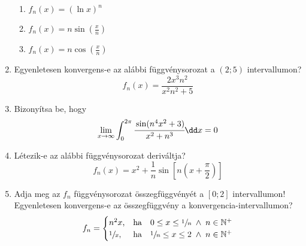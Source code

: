 \documentclass[a4paper, 12pt]{scrartcl}
\begin{document}
\begin{enumerate}
\begin{multicols}{2}
\begin{enumerate}
            \item $
                    f_n(x) = (\ln x)^n
                  $

            \item $\displaystyle
                    f_n(x) = n\sin\left(\frac{x}{n}\right)
                  $

            \item $\displaystyle
                    f_n(x) = n\cos\left(\frac{x}{n}\right)
                  $
          \end{enumerate}
        \end{multicols}

  \item Egyenletesen konvergens-e az alábbi függvénysorozat a $(2; 5)$
        intervallumon?
        $$
          f_n(x) = \frac{2x^3n^2}{x^2n^2+5}
        $$

  \item Bizonyítsa be, hogy
        $$
          \lim_{x \to \infty} \int_{0}^{2\pi} \cfrac{\sin (n^4x^2+3)}{x^2+n^3} \dd x = 0
        $$

  \item Létezik-e az alábbi függvénysorozat deriváltja?
        $$
          f_n(x) = x^2 + \frac{1}{n}\sin\left[n\left(x+\frac{\pi}{2}\right)\right]
        $$

  \item Adja meg az $f_n$ függvénysorozat összegfüggvényét a $[0; 2]$
        intervallumon! Egyenletesen konvergens-e az összegfüggvény a
        konvergencia-intervallumon?
        $$
          f_n = \begin{cases}
            n^2 x \text,        & \text{ha} \quad 0 \leq x \leq \sfrac{1}{n} \; \land \; n \in \mathbb N^+ \\
            \sfrac{1}{x} \text, & \text{ha} \quad \sfrac{1}{n} \leq x \leq 2 \; \land \; n \in \mathbb N^+
          \end{cases}
        $$
\end{enumerate}
\end{document}
